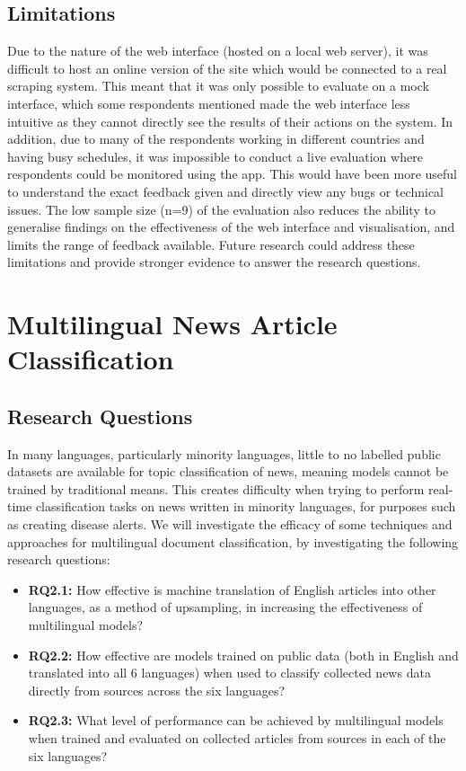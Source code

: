 \documentclass{l4proj}
\begin{document}
\subsection{Limitations}
\label{section:interface-limitations}
Due to the nature of the web interface (hosted on a local web server), it was difficult to host an online version of the site which would be connected to a real scraping system. This meant that it was only possible to evaluate on a mock interface, which some respondents mentioned made the web interface less intuitive as they cannot directly see the results of their actions on the system. In addition, due to many of the respondents working in different countries and having busy schedules, it was impossible to conduct a live evaluation where respondents could be monitored using the app. This would have been more useful to understand the exact feedback given and directly view any bugs or technical issues. The low sample size (n=9) of the evaluation also reduces the ability to generalise findings on the effectiveness of the web interface and visualisation, and limits the range of feedback available. Future research could address these limitations and provide stronger evidence to answer the research questions.


\section{Multilingual News Article Classification}

\subsection{Research Questions}
In many languages, particularly minority languages, little to no labelled public datasets are available for topic classification of news, meaning models cannot be trained by traditional means. This creates difficulty when trying to perform real-time classification tasks on news written in minority languages, for purposes such as creating disease alerts. We will investigate the efficacy of some techniques and approaches for multilingual document classification, by investigating the following research questions: 
\begin{itemize}
\item \textbf{RQ2.1: }How effective is machine translation of English articles into other languages, as a method of upsampling, in increasing the effectiveness of multilingual models? 
\item \textbf{RQ2.2: }How effective are models trained on public data (both in English and translated into all 6 languages) when used to classify collected news data directly from sources across the six languages? 
\item \textbf{RQ2.3: }What level of performance can be achieved by multilingual models when trained and evaluated on collected articles from sources in each of the six languages?
\end{itemize}
\end{document}
